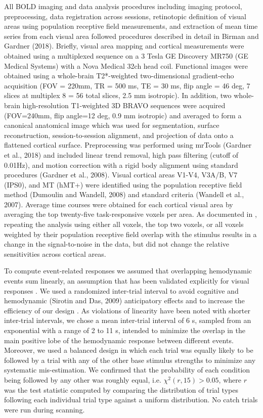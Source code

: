 \documentclass{report}
\begin{document}
All BOLD imaging and data analysis procedures including imaging protocol, preprocessing, data registration across sessions, retinotopic definition of visual areas using population receptive field measurements, and extraction of mean time series from each visual area followed procedures described in detail in Birman and Gardner (2018). Briefly, visual area mapping and cortical measurements were obtained using a multiplexed sequence on a 3 Tesla GE Discovery MR750 (GE Medical Systems) with a Nova Medical 32ch head coil. Functional images were obtained using a whole-brain T2*-weighted two-dimensional gradient-echo acquisition (FOV = 220mm, TR = 500 ms, TE = 30 ms, flip angle = 46 deg, 7 slices at multiplex 8 = 56 total slices, 2.5 mm isotropic). In addition, two whole-brain high-resolution T1-weighted 3D BRAVO sequences were acquired (FOV=240mm, flip angle=12 deg, 0.9 mm isotropic) and averaged to form a canonical anatomical image which was used for segmentation, surface reconstruction, session-to-session alignment, and projection of data onto a flattened cortical surface. Preprocessing was performed using mrTools (Gardner et al., 2018) and included linear trend removal, high pass filtering (cutoff of 0.01Hz), and motion correction with a rigid body alignment using standard procedures (Gardner et al., 2008). Visual cortical areas V1-V4, V3A/B, V7 (IPS0), and MT (hMT+) were identified using the population receptive field method (Dumoulin and Wandell, 2008) and standard criteria (Wandell et al., 2007). Average time courses were obtained for each cortical visual area by averaging the top twenty-five task-responsive voxels per area. As documented in \citet{Birman2018-sp}, repeating the analysis using either all voxels, the top two voxels, or all voxels weighted by their population receptive field overlap with the stimulus results in a change in the signal-to-noise in the data, but did not change the relative sensitivities across cortical areas. 

To compute event-related responses we assumed that overlapping hemodynamic events sum linearly, an assumption that has been validated explicitly for visual responses \citep{Boynton1996-ff,Dale1997-ur}. We used a randomized inter-trial interval to avoid cognitive \citep{Zarahn1997-jc} and hemodynamic (Sirotin and Das, 2009) anticipatory effects and to increase the efficiency of our design \citep{Dale1999-oq,Liu2004-qy}. As violations of linearity have been noted with shorter inter-trial intervals, we chose a mean inter-trial interval of 6 s, sampled from an exponential with a range of 2 to 11 s, intended to minimize the overlap in the main positive lobe of the hemodynamic response between different events. Moreover, we used a balanced design in which each trial was equally likely to be followed by a trial with any of the other base stimulus strengths to minimize any systematic mis-estimation. We confirmed that the probability of each condition being followed by any other was roughly equal, i.e. $\chi^2(r,15)>0.05$, where $r$ was the test statistic computed by comparing the distribution of trial types following each individual trial type against a uniform distribution. No catch trials were run during scanning.
\end{document}
